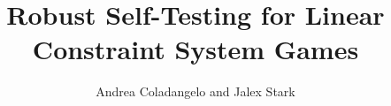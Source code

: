 \documentclass{article}
\begin{document}
\title{Robust Self-Testing for Linear Constraint System Games}
\author{Andrea Coladangelo and Jalex Stark}
\maketitle

\tableofcontents


\end{document}
